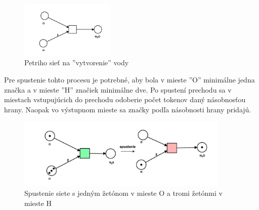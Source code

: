 \begin{figure}[h]
	\centerline{\includegraphics[width=0.4\textwidth]{images/vojvoda}}
	\caption{Petriho sieť na ''vytvorenie'' vody}
	\label{obr:voda}
\end{figure}


Pre spustenie tohto procesu je potrebné, aby bola v mieste ''O'' minimálne jedna značka a v mieste ''H'' značiek minimálne dve. Po spustení prechodu sa v miestach vstupujúcich do prechodu odoberie počet tokenov daný násobnosťou hrany. Naopak vo výstupnom mieste sa značky podľa násobnosti hrany pridajú.  

\begin{figure}[h]
	\centerline{\includegraphics[width=0.9\textwidth]{images/vojvoda2}}
	\caption{Spustenie siete s jedným žetónom v mieste O a tromi žetónmi v mieste H}
	\label{obr:voda2}
\end{figure}





